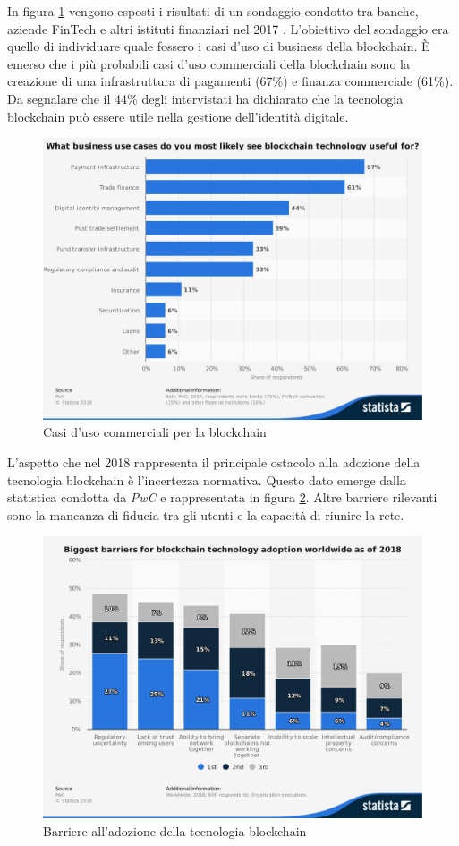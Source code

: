 In figura \ref{fig:use-cases-among-businesses} vengono esposti i risultati di un sondaggio
condotto tra banche, aziende FinTech e altri istituti finanziari nel 2017 \cite{use-cases-among-businesses}.
L'obiettivo
del sondaggio era quello di individuare quale fossero i casi d'uso di business
della blockchain. È emerso che i più probabili casi d'uso commerciali della blockchain
sono la creazione di una infrastruttura di pagamenti (67\%) e finanza commerciale (61\%).
Da segnalare che il 44\% degli intervistati ha dichiarato che
la tecnologia blockchain può essere utile nella gestione dell'identità digitale.

\begin{figure}[H]
	\centering
	\includegraphics[width=.75\linewidth]{images/chap_intro/use-cases-among-businesses.pdf}
	\caption{Casi d'uso commerciali per la blockchain
		\cite{use-cases-among-businesses}}
	\label{fig:use-cases-among-businesses}
\end{figure}


L'aspetto che nel 2018 rappresenta il principale ostacolo alla adozione della tecnologia blockchain
è l'incertezza normativa. Questo dato emerge dalla statistica condotta da
\textit{PwC} \cite{barriers-worldwide}
e rappresentata in figura \ref{fig:barriers-worldwide}.
Altre barriere rilevanti sono la mancanza di fiducia tra gli utenti e la capacità di riunire la rete.


\begin{figure}[H]
	\centering
	\includegraphics[width=.75\linewidth]{images/chap_intro/barriers-worldwide.pdf}
	\caption{Barriere all'adozione della tecnologia blockchain
		\cite{barriers-worldwide}}
	\label{fig:barriers-worldwide}
\end{figure}